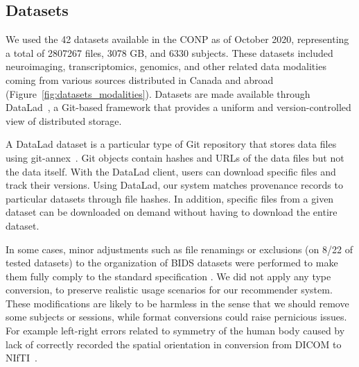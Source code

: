 \documentclass[conference]{IEEEtran}
\begin{document}
\subsection{Datasets} 

We used the 42 datasets available in the CONP as of October 2020,
representing a total of 2807267 files, 3078 GB, and 6330 subjects.
These datasets included neuroimaging, transcriptomics, genomics, and other
related data modalities coming from various sources distributed in Canada
and abroad (Figure~\ref{fig:datasets_modalities}). Datasets are made available through DataLad~\cite{datalad2021},
a Git-based framework that provides a uniform and version-controlled view of
distributed storage.

A DataLad dataset is a particular type of Git repository that stores
 data files using git-annex~\cite{gitannex}. Git objects contain
hashes and URLs of the data files but not the data itself. With the DataLad
client, users can download specific files and track their versions. Using
DataLad, our system matches provenance records to particular datasets
through file hashes. In addition, specific files from a given dataset can
be downloaded on demand without having to download the entire dataset. 

 In some cases, minor adjustments such as file renamings or exclusions (on 8/22 of tested datasets) to the organization of BIDS datasets were performed to make them fully comply to the standard specification . We did not apply any type conversion, to preserve realistic
 usage scenarios for our recommender system.
 These modifications are likely to be harmless in the sense that we should remove some subjects or sessions, while format conversions could raise pernicious issues. For example left-right errors related to symmetry of the human body caused by lack of correctly recorded the spatial orientation in conversion from DICOM to NIfTI~\cite{li2016first}. 
 
 
\end{document}
